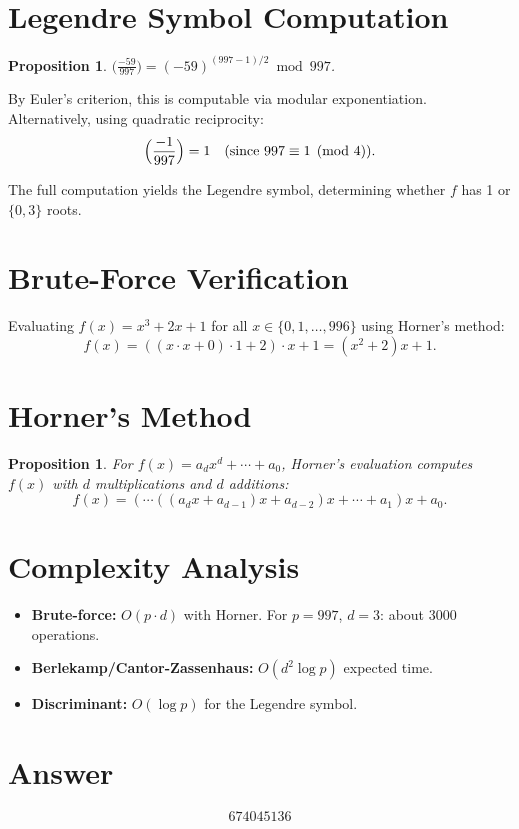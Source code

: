 \documentclass[11pt]{article}
\newtheorem{proposition}[theorem]{Proposition}
\begin{document}
\section{Legendre Symbol Computation}

\begin{proposition}
$\bigl(\frac{-59}{997}\bigr) = (-59)^{(997-1)/2} \bmod 997$.
\end{proposition}

By Euler's criterion, this is computable via modular exponentiation. Alternatively, using quadratic reciprocity:
\[
\Bigl(\frac{-1}{997}\Bigr) = 1 \quad (\text{since } 997 \equiv 1 \pmod{4}).
\]

The full computation yields the Legendre symbol, determining whether $f$ has 1 or $\{0, 3\}$ roots.

\section{Brute-Force Verification}

Evaluating $f(x) = x^3 + 2x + 1$ for all $x \in \{0, 1, \ldots, 996\}$ using Horner's method:
\[
f(x) = ((x \cdot x + 0) \cdot 1 + 2) \cdot x + 1 = (x^2 + 2)x + 1.
\]

\section{Horner's Method}

\begin{proposition}
For $f(x) = a_d x^d + \cdots + a_0$, Horner's evaluation computes $f(x)$ with $d$ multiplications and $d$ additions:
\[
f(x) = (\cdots((a_d x + a_{d-1})x + a_{d-2})x + \cdots + a_1)x + a_0.
\]
\end{proposition}

\section{Complexity Analysis}

\begin{itemize}
\item \textbf{Brute-force:} $O(p \cdot d)$ with Horner. For $p = 997$, $d = 3$: about 3000 operations.
\item \textbf{Berlekamp/Cantor-Zassenhaus:} $O(d^2 \log p)$ expected time.
\item \textbf{Discriminant:} $O(\log p)$ for the Legendre symbol.
\end{itemize}

\section{Answer}

\[
\boxed{674045136}
\]
\end{document}
